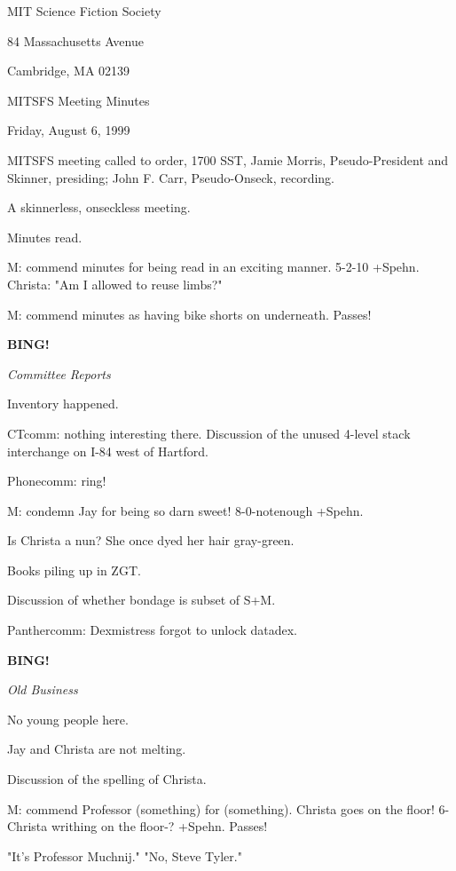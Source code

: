 \documentclass[12pt]{article}
\newcommand{\bing}{{\bf BING!} }
\newcommand{\goto}[1]{\bing \vskip 12pt \centerline{{\em{#1}}}}
\begin{document}
\begin{center}

MIT Science Fiction Society 

84 Massachusetts Avenue

Cambridge, MA 02139

\vspace{12pt}

MITSFS Meeting Minutes 

Friday, August 6, 1999

\end{center}
 
\vspace{18pt}

\setlength{\parskip}{6pt}

\noindent
MITSFS meeting called to order, 1700 SST,
Jamie Morris, Pseudo-President and Skinner, presiding; John F. Carr, Pseudo-Onseck, recording.

A skinnerless, onseckless meeting.

Minutes read.

M: commend minutes for being read in an exciting manner. 5-2-10 +Spehn. Christa: "Am I allowed to reuse limbs?"

M: commend minutes as having bike shorts on underneath. Passes!

\goto{Committee Reports}

Inventory happened.

CTcomm: nothing interesting there. Discussion of the unused 4-level stack interchange on I-84 west of Hartford.

Phonecomm: ring!

M: condemn Jay for being so darn sweet! 8-0-notenough +Spehn.

Is Christa a nun? She once dyed her hair gray-green.

Books piling up in ZGT.

Discussion of whether bondage is subset of S+M.

Panthercomm: Dexmistress forgot to unlock datadex.

\goto{Old Business}

No young people here.

Jay and Christa are not melting.

Discussion of the spelling of Christa.

M: commend Professor (something) for (something). Christa goes on the floor! 6-Christa writhing on the floor-? +Spehn. Passes!

"It's Professor Muchnij." "No, Steve Tyler."
\end{document}
